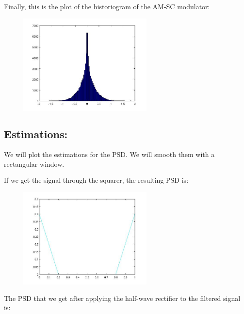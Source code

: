 \documentclass[a4paper,11pt]{article}
\begin{document}
\newpage

Finally, this is the plot of the historiogram of the AM-SC modulator:

\begin{figure}[!hp]
    \begin{center}
    \includegraphics[width=0.6\textwidth]{images/lab3_redo_36.jpg}
    \end{center}
\end{figure}

\newpage

\subsection{Estimations:}

We will plot the estimations for the PSD. We will smooth them with a rectangular window.

If we get the signal through the squarer, the resulting PSD is:

\begin{figure}[!hp]
    \begin{center}
    \includegraphics[width=0.6\textwidth]{images/lab3_redo_26.jpg}
    \end{center}
\end{figure}

The PSD that we get after applying the half-wave rectifier to the filtered signal is:
\end{document}
